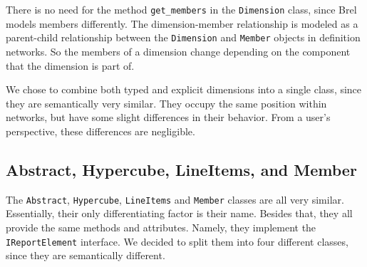 There is no need for the method \texttt{get\_members} in the \texttt{Dimension} class,
since Brel models members differently.
The dimension-member relationship is modeled as a parent-child relationship between the \texttt{Dimension} and \texttt{Member} objects in definition networks.
So the members of a dimension change depending on the component that the dimension is part of.

We chose to combine both typed and explicit dimensions into a single class,
since they are semantically very similar.
They occupy the same position within networks, but have some slight differences in their behavior.
From a user's perspective, these differences are negligible.

\subsection{Abstract, Hypercube, LineItems, and Member}

The \texttt{Abstract}, \texttt{Hypercube}, \texttt{LineItems} and \texttt{Member} classes are all very similar.
Essentially, their only differentiating factor is their name.
Besides that, they all provide the same methods and attributes.
Namely, they implement the \texttt{IReportElement} interface.
We decided to split them into four different classes, since they are semantically different.
